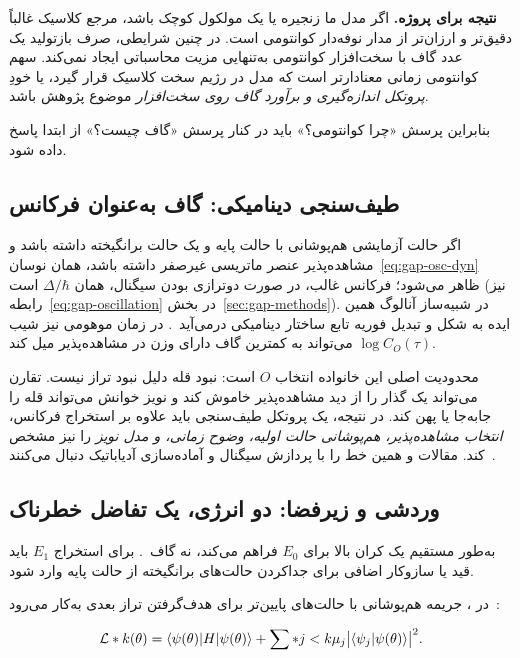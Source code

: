 \textbf{نتیجه برای پروژه.}
اگر مدل ما زنجیره  یا یک مولکول کوچک باشد، مرجع کلاسیک غالباً دقیق‌تر و ارزان‌تر از مدار نوفه‌دار کوانتومی است.
در چنین شرایطی، صرف بازتولید یک عدد گاف با سخت‌افزار کوانتومی به‌تنهایی مزیت محاسباتی ایجاد نمی‌کند.
سهم کوانتومی زمانی معنادارتر است که مدل در رژیم سخت کلاسیک قرار گیرد، یا خودِ \emph{پروتکل اندازه‌گیری و برآورد گاف روی سخت‌افزار} موضوع پژوهش باشد.

بنابراین پرسش «چرا کوانتومی؟» باید در کنار پرسش «گاف چیست؟» از ابتدا پاسخ داده شود.

\subsection{طیف‌سنجی دینامیکی: گاف به‌عنوان فرکانس}

اگر حالت آزمایشی هم‌پوشانی با حالت پایه و یک حالت برانگیخته داشته باشد و مشاهده‌پذیر عنصر ماتریسی غیرصفر داشته باشد، همان نوسان~\eqref{eq:gap-osc-dyn} ظاهر می‌شود؛ فرکانس غالب، در صورت دو‌ترازی بودن سیگنال، همان $\Delta/\hbar$ است (نیز رابطه~\eqref{eq:gap-oscillation} در بخش~\ref{sec:gap-methods}).
در شبیه‌ساز آنالوگ همین ایده به شکل  و تبدیل فوریه تابع ساختار دینامیکی درمی‌آید~\cite{Georgescu2014,Daley2022}.
در زمان موهومی نیز شیب $\log C_O(\tau)$ می‌تواند به کمترین گاف دارای وزن در مشاهده‌پذیر میل کند.

محدودیت اصلی این خانواده انتخاب $O$ است: نبود قله دلیل نبود تراز نیست.
تقارن می‌تواند یک گذار را از دید مشاهده‌پذیر خاموش کند و نویز خوانش می‌تواند قله را جابه‌جا یا پهن کند.
در نتیجه، یک پروتکل طیف‌سنجی باید علاوه بر استخراج فرکانس، \emph{انتخاب مشاهده‌پذیر، هم‌پوشانی حالت اولیه، وضوح زمانی، و مدل نویز} را نیز مشخص کند.
مقالات  و  همین خط را با پردازش سیگنال و آماده‌سازی آدیاباتیک دنبال می‌کنند~\cite{GapLee2025,GapCugini2025}.

\subsection{وردشی و زیرفضا: دو انرژی، یک تفاضل خطرناک}

 به‌طور مستقیم یک کران بالا برای $E_0$ فراهم می‌کند، نه گاف~\cite{Peruzzo2014,Tilly2022}.
برای استخراج $E_1$ باید قید یا سازوکار اضافی برای جداکردن حالت‌های برانگیخته از حالت پایه وارد شود.

در ، جریمه هم‌پوشانی با حالت‌های پایین‌تر برای هدف‌گرفتن تراز بعدی به‌کار می‌رود~\cite{GapHiggott2019}:

\begin{equation}
	{\cal L}*k(\theta)
	=
	\langle\psi(\theta)|H|\psi(\theta)\rangle
	+
	\sum*{j<k}\mu_j
	\bigl|\langle\psi_j|\psi(\theta)\rangle\bigr|^2.
\end{equation}

